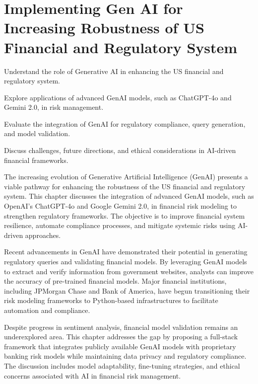 \documentclass[a4paper,headinclude=on,footinclude=on,12pt,oneside]{scrbook}
\begin{document}
	
	\chapter{Implementing Gen AI for Increasing Robustness of US Financial and Regulatory System}
	
	\begin{arrows}
		\item Understand the role of Generative AI in enhancing the US financial and regulatory system.
		\item Explore applications of advanced GenAI models, such as ChatGPT-4o and Gemini 2.0, in risk management.
		\item Evaluate the integration of GenAI for regulatory compliance, query generation, and model validation.
		\item Discuss challenges, future directions, and ethical considerations in AI-driven financial frameworks.
	\end{arrows}
	
	The increasing evolution of Generative Artificial Intelligence (GenAI) presents a viable pathway for enhancing the robustness of the US financial and regulatory system. This chapter discusses the integration of advanced GenAI models, such as OpenAI’s ChatGPT-4o and Google Gemini 2.0, in financial risk modeling to strengthen regulatory frameworks. The objective is to improve financial system resilience, automate compliance processes, and mitigate systemic risks using AI-driven approaches.
	
	Recent advancements in GenAI have demonstrated their potential in generating regulatory queries and validating financial models. By leveraging GenAI models to extract and verify information from government websites, analysts can improve the accuracy of pre-trained financial models. Major financial institutions, including JPMorgan Chase and Bank of America, have begun transitioning their risk modeling frameworks to Python-based infrastructures to facilitate automation and compliance.
	
	Despite progress in sentiment analysis, financial model validation remains an underexplored area. This chapter addresses the gap by proposing a full-stack framework that integrates publicly available GenAI models with proprietary banking risk models while maintaining data privacy and regulatory compliance. The discussion includes model adaptability, fine-tuning strategies, and ethical concerns associated with AI in financial risk management.
	
\end{document}
